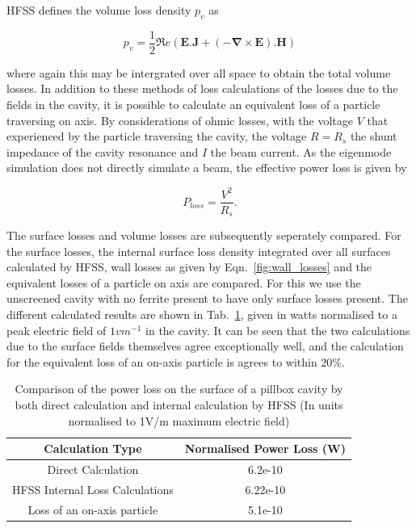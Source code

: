 HFSS defines the volume loss density $p_{v}$ as 

\begin{equation}
p_{v}=\frac{1}{2}\Re{}e\left( \mathbf{E}.\mathbf{J} + \left( -\mathbf{\nabla} \times \mathbf{E} \right).\mathbf{H} \right) 
\label{eqn:vol_loss_density}
\end{equation}

where again this may be intergrated over all space to obtain the total volume losses. In addition to these methods of loss calculations of the losses due to the fields in the cavity, it is possible to calculate an equivalent loss of a particle traversing on axis. By considerations of ohmic losses, with the voltage $V$ that experienced by the particle traversing the cavity, the voltage $R = R_{s}$ the shunt impedance of the cavity resonance and $I$ the beam current. As the eigenmode simulation does not directly simulate a beam, the effective power loss is given by 

\begin{equation}
P_{loss} = \frac{V^{2}}{R_{s}}.
\end{equation}

The surface losses and volume losses are subsequently seperately compared. For the surface losses, the internal surface loss density integrated over all surfaces calculated by HFSS, wall losses as given by Eqn.~\ref{fig:wall_losses} and the equivalent losses of a particle on axis are compared. For this we use the unscreened cavity with no ferrite present to have only surface losses present. The different calculated results are shown in Tab.~\ref{tab:surface_losses_ferr}, given in watts normalised to a peak electric field of $1v m^{-1}$ in the cavity. It can be seen that the two calculations due to the surface fields themselves agree exceptionally well, and the calculation for the equivalent loss of an on-axis particle is agrees to within 20\%. 

\begin{table}
\caption{Comparison of the power loss on the surface of a pillbox cavity by both direct calculation and internal calculation by HFSS (In units normalised to 1V/m maximum electric field)}
\begin{center}
\begin{tabular}{c | c }
Calculation Type & Normalised Power Loss (W)\\ \hline
Direct Calculation & 6.2e-10\\ \hline
HFSS Internal Loss Calculations & 6.22e-10 \\ \hline
Loss of an on-axis particle	 & 5.1e-10 \\
\end{tabular}
\end{center}
\label{tab:surface_losses_ferr}
\end{table}

